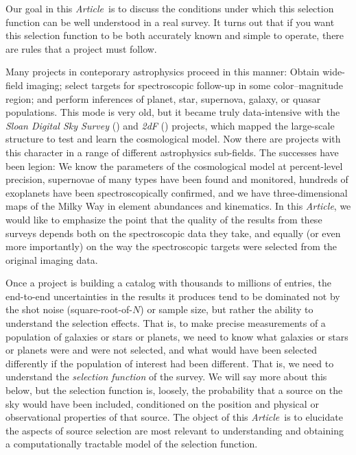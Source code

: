 \documentclass[modern]{aastex62}
\newcommand{\documentname}{\textsl{Article}}
\newcommand{\project}[1]{\textsl{#1}}
\begin{document}
Our goal in this \documentname\ is to discuss the conditions under
which this selection function can be well understood in a real survey.
It turns out that if you want this selection function to be both
accurately known and simple to operate, there are rules that a project
must follow.

Many projects in conteporary astrophysics proceed in this manner:
Obtain wide-field imaging; select targets for spectroscopic follow-up
in some color--magnitude region; and perform inferences of planet,
star, supernova, galaxy, or quasar populations.
This mode is very old, but it became truly data-intensive with
the \project{Sloan Digital Sky Survey} (\citealt{sdss})
and \project{2dF} (\citealt{2df})
projects, which mapped the large-scale structure to test and learn the
cosmological model.
Now there are projects with this character in a range of different
astrophysics sub-fields.
The successes have been legion:
We know the parameters of the cosmological model at percent-level
precision, supernovae of many types have been found and monitored,
hundreds of exoplanets have been spectroscopically confirmed,
and we have three-dimensional maps of the Milky Way in
element abundances and kinematics.
In this \documentname, we would like to emphasize the point that the
quality of the results from these surveys depends both on the
spectroscopic data they take, and equally (or even more importantly)
on the way the spectroscopic targets were selected from the original
imaging data.

Once a project is building a catalog with thousands to millions of
entries, the end-to-end uncertainties in the results it produces tend
to be dominated not by the shot noise (square-root-of-$N$) or sample
size, but rather the ability to understand the selection effects.
That is, to make precise measurements of a population of galaxies or
stars or planets, we need to know what galaxies or stars or planets
were and were not selected, and what would
have been selected differently if the population of interest had been
different.
That is, we need to understand the \emph{selection function} of the
survey.
We will say more about this below, but the selection function is,
loosely, the probability that a source on the sky would have been
included, conditioned on the
position and physical or observational properties of that source.
The object of this \documentname\ is to elucidate the aspects of
source selection are most relevant to understanding and obtaining a
computationally tractable model of the selection function.
\end{document}
